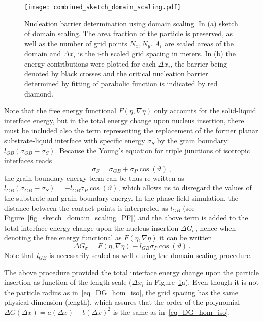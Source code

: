 \begin{figure}
	\centering
	\texttt{[image: combined\_sketch\_domain\_scaling.pdf]}
	\caption{Nucleation barrier determination using domain scaling. In (a) sketch of domain scaling. The area fraction of the particle is preserved, as well as the number of grid points $N_x, N_y$. $A_i$ are scaled areas of the domain and $\Delta x_i$ is the i-th scaled grid spacing in meters. In (b) the energy contributions were plotted for each $\Delta x_i$, the barrier being denoted by black crosses and the critical nucleation barrier determined by fitting of parabolic function is indicated by red diamond.}
	\label{fig_domain_scaling}
\end{figure}	

Note that the free energy functional $F(\eta,\nabla\eta)$ only accounts for the solid-liquid interface energy, but in the total energy change upon nucleus insertion, there must be included also the term representing the replacement of the former planar substrate-liquid interface with specific energy $\sigma_S$ by the grain boundary: $l_{GB}(\sigma_{GB}-\sigma_S)$. Because the Young's equation for triple junctions of isotropic interfaces reads
\begin{equation}\label{eq_young_iso}
	\sigma_S = \sigma_{GB}+\sigma_P\cos(\vartheta) \,,
\end{equation}
the grain-boundary-energy term can be thus re-written as $l_{GB}(\sigma_{GB}-\sigma_S)=-l_{GB}\sigma_P\cos(\vartheta)$, which allows us to disregard the values of the substrate and grain boundary energy. In the phase field simulation, the distance between the contact points is interpreted as $l_{GB}$ (see Figure~\ref{fig_sketch_domain_scaling_PF}) and the above term is added to the total interface energy change upon the nucleus insertion $\Delta G_\sigma$, hence when denoting the free energy functional as $F(\eta,\nabla\eta)$ it can be written
\begin{equation}
	\Delta G_\sigma = F(\eta,\nabla\eta) - l_{GB}\sigma_P\cos(\vartheta) \,.
\end{equation}
Note that $l_{GB}$ is necessarily scaled as well during the domain scaling procedure.

The above procedure provided the total interface energy change upon the particle insertion as function of the length scale ($\Delta x_i$ in Figure~\ref{fig_domain_scaling}a). Even though it is not the particle radius as in~\eqref{eq_DG_hom_iso}, the grid spacing has the same physical dimension (length), which assures that the order of the polynomial $\Delta G(\Delta x) = a(\Delta x) - b(\Delta x)^2$ is the same as in~\eqref{eq_DG_hom_iso}.

